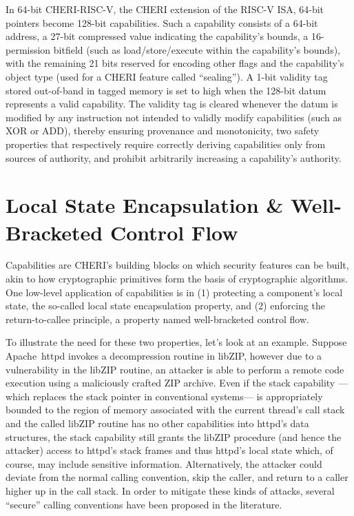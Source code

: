 \documentclass[main.tex]{subfiles}
\begin{document}
In 64-bit CHERI-RISC-V, the CHERI extension of the RISC-V ISA, 64-bit pointers become 128-bit capabilities. Such a capability consists of a 64-bit address, a 27-bit compressed value indicating the capability’s bounds, a 16-permission bitfield (such as load/store/execute within the capability’s bounds), with the remaining 21 bits reserved for encoding other flags and the capability’s object type (used for a CHERI feature called “sealing”). A 1-bit validity tag stored out-of-band in tagged memory is set to high when the 128-bit datum represents a valid capability. The validity tag is cleared whenever the datum is modified by any instruction not intended to validly modify capabilities (such as XOR or ADD), thereby ensuring provenance and monotonicity, two safety properties that respectively require correctly deriving capabilities only from sources of authority, and prohibit arbitrarily increasing a capability’s authority.\cite{intro2cheri}

\section{Local State Encapsulation \& Well-Bracketed Control Flow}
Capabilities are CHERI’s building blocks on which security features can be built, akin to how cryptographic primitives form the basis of cryptographic algorithms. One low-level application of capabilities is in (1) protecting a component's local state, the so-called local state encapsulation property, and (2) enforcing the return-to-callee principle, a property named well-bracketed control flow.

To illustrate the need for these two properties, let’s look at an example. Suppose Apache httpd invokes a decompression routine in libZIP, however due to a vulnerability in the libZIP routine, an attacker is able to perform a remote code execution using a maliciously crafted ZIP archive. Even if the stack capability —which replaces the stack pointer in conventional systems— is appropriately bounded to the region of memory associated with the current thread’s call stack and the called libZIP routine has no other capabilities into httpd’s data structures, the stack capability still grants the libZIP procedure (and hence the attacker) access to httpd’s stack frames and thus httpd’s local state which, of course, may include sensitive information. Alternatively, the attacker could deviate from the normal calling convention, skip the caller, and return to a caller higher up in the call stack. In order to mitigate these kinds of attacks, several “secure” calling conventions have been proposed in the literature.
\end{document}
